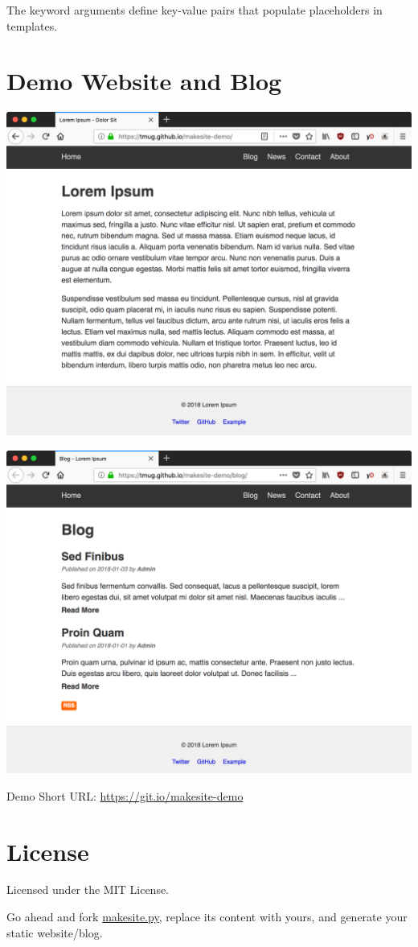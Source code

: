 \documentclass[a0]{a0poster}
\begin{document}
\begin{multicols}{4}
    \smallskip

    The keyword arguments define key-value pairs that populate
    placeholders in templates.

    \bigskip


    \section*{Demo Website and Blog}
    \includegraphics[width=23cm]{makesite-demo-home.png}

    \includegraphics[width=23cm]{makesite-demo-blog.png}

    Demo Short URL: \url{https://git.io/makesite-demo}


    \color{Navy}
    \section*{License}
    Licensed under the MIT License.

    Go ahead and fork
    \href{https://github.com/sunainapai/makesite}{makesite.py}, replace
    its content with yours, and generate your static website/blog.

\end{multicols}
\end{document}
